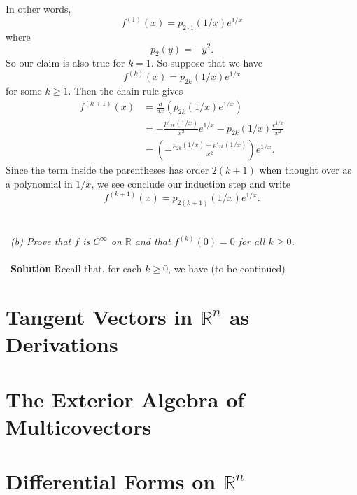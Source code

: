 \documentclass[12 pt]{article}
\newcommand{\R}{\mathbb{R}}
\newcommand{\LP}{\left(}
\newcommand{\RP}{\right)}
\numberwithin{equation}{section}
\begin{document}
In other words, \begin{equation*}
f^{(1)}(x) = p_{2 \cdot 1} (1/x) e^{1/x}
\end{equation*}
where \begin{equation*}
p_2(y) = - y^2.
\end{equation*}
So our claim is also true for $k = 1$. So suppose that we have \begin{equation*}
f^{(k)}(x) = p_{2k} (1/x) e^{1/x}
\end{equation*}
for some $k \geq 1$. Then the chain rule gives \begin{align*}
f^{(k+1)}(x) & = \frac{d}{dx} \LP p_{2k} (1/x) e^{1/x} \RP \\
\ & =  - \frac{p'_{2k}(1/x)}{x^2}  e^{1/x} - p_{2k} (1/x) \frac{e^{1/x}}{x^2} \\
\ & = \LP - \frac{p_{2k}(1/x) + p'_{2k}(1/x)}{x^2} \RP e^{1/x}.
\end{align*}
Since the term inside the parentheses has order $2(k+1)$ when thought over as a polynomial in $1/x$, we see conclude our induction step and write \begin{equation*}
f^{(k+1)}(x) = p_{2(k+1)} (1/x) e^{1/x}.
\end{equation*}
\\
\\
\
\textit{(b) Prove that $f$ is $C^\infty$ on $\R$ and that $f^{(k)}(0) = 0$ for all $k \geq 0$.}\\
\\
\
\textbf{Solution} Recall that, for each $k \geq 0$, we have (to be continued)
\section{Tangent Vectors in $\R^n$ as Derivations}

\section{The Exterior Algebra of Multicovectors}

\section{Differential Forms on $\R^n$}
\end{document}
